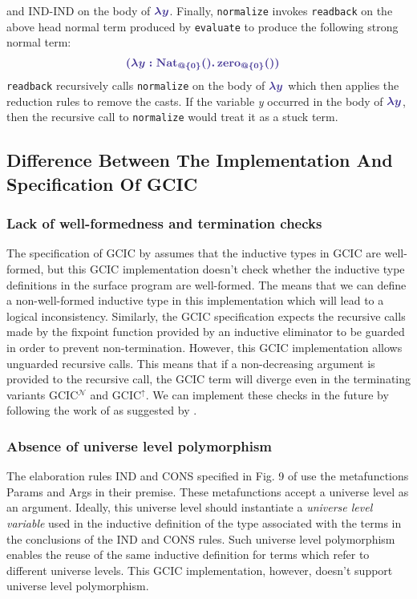 \documentclass{article}
\theoremstyle{definition}
\newcommand{\Gcode}[1]{{\color{OliveGreen}\textit{#1}}}
\newcommand{\Ccode}[1]{{\color{BlueViolet}\textbf{#1}}}
\newcommand{\Ccmath}[1]{{\color{BlueViolet}\boldsymbol{#1}}}
\newcommand{\GCICN}[0]{GCIC\(^\mathcal{N}\)}
\newcommand{\GCICS}[0]{GCIC\(^\uparrow\)}
\begin{document}
and IND-IND on the body of \(\Ccmath{\lambda y}\). Finally, \texttt{normalize}
invokes \texttt{readback} on the above head normal term produced by
\texttt{evaluate} to produce the following strong normal term:
\[
\begin{aligned}
  &\Ccmath{(\lambda y : \text{\Ccode{Nat}}_{@\{0\}}() .\,
    \text{\Ccode{zero}\(_{@\{0\}}\)\Ccode{()}})}
\end{aligned}
\]
\texttt{readback} recursively calls \texttt{normalize} on the body of
\(\Ccmath{\lambda y}\) which then applies the reduction rules to remove the
casts. If the variable \Gcode{y} occurred in the body of \(\Ccmath{\lambda y}\),
then the recursive call to \texttt{normalize} would treat it as a stuck term.

\subsection{Difference Between The Implementation And Specification Of GCIC}
\label{sec:impl-differences}

\subsubsection{Lack of well-formedness and termination checks}
The specification of GCIC by \citet{lennon-bertrand_gradualizing_2022} assumes
that the inductive types in GCIC are well-formed, but this GCIC implementation
doesn't check whether the inductive type definitions in the surface program are
well-formed. The means that we can define a non-well-formed inductive type in
this implementation which will lead to a logical inconsistency. Similarly, the
GCIC specification expects the recursive calls made by the fixpoint function
provided by an inductive eliminator to be guarded in order to prevent
non-termination. However, this GCIC implementation allows unguarded recursive
calls. This means that if a non-decreasing argument is provided to the recursive
call, the GCIC term will diverge even in the terminating variants \GCICN{} and
\GCICS{}. We can implement these checks in the future by following the work of
\citet{gimenez_structural_1998} as suggested by
\citet{lennon-bertrand_gradualizing_2022}.

\subsubsection{Absence of universe level polymorphism}
The elaboration rules IND and CONS specified in Fig. 9 of
\citet{lennon-bertrand_gradualizing_2022} use the metafunctions Params and Args
in their premise. These metafunctions accept a universe level as an argument.
Ideally, this universe level should instantiate a \textit{universe level
  variable} used in the inductive definition of the type associated with the
terms in the conclusions of the IND and CONS rules. Such universe level
polymorphism enables the reuse of the same inductive definition for terms which
refer to different universe levels. This GCIC implementation, however, doesn't
support universe level polymorphism.
\end{document}
